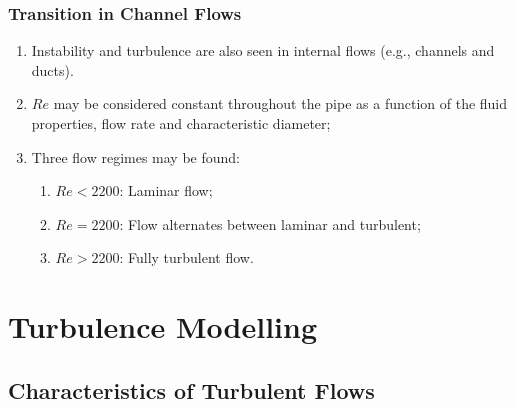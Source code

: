 \documentclass[10pt,compress,handout,ignorenonframetext]{beamer}
\begin{document}
\begin{frame}
 \frametitle{Transition in Channel Flows}
     \begin{enumerate}%
        \item<1-> Instability and turbulence are also seen in internal flows (e.g., channels and ducts).
        \item<1-> $Re$ may be considered constant throughout the pipe as a function of the fluid properties, flow rate and characteristic diameter;
        \item<2-> Three flow regimes may be found:
            \begin{enumerate}
                \item<2-> $Re < 2200$: Laminar flow;
                \item<2-> $Re = 2200$: Flow alternates between laminar and turbulent;
                \item<2-> $Re > 2200$: Fully turbulent flow.
            \end{enumerate}
       \end{enumerate}

\end{frame}

\section{Turbulence Modelling}

\subsection{Characteristics of Turbulent Flows}
\end{document}
